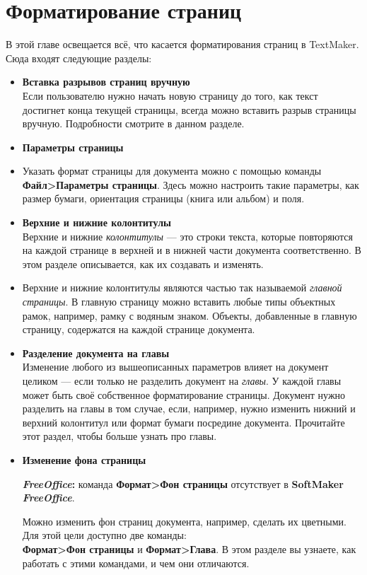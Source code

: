 ﻿\documentclass[a4paper,10pt]{article}
\begin{document}
\section{Форматирование страниц} \label{sec:форматировсстр}
В этой главе освещается всё, что касается форматирования страниц в TextMaker. Сюда входят следующие разделы:
\begin{itemize}
 \item \textbf{Вставка разрывов страниц вручную}\\
 Если пользователю нужно начать новую страницу до того, как текст достигнет конца текущей страницы, всегда можно вставить разрыв страницы вручную. Подробности смотрите в данном разделе.
\item \textbf{Параметры страницы}\\
\item Указать формат страницы для документа можно с помощью команды \textbf{Файл>Параметры страницы}. Здесь можно настроить такие параметры, как размер бумаги, ориентация страницы (книга или альбом) и поля.
\item \textbf{Верхние и нижние колонтитулы}\\
Верхние и нижние \textit{колонтитулы} — это строки текста, которые повторяются на каждой странице в верхней и в нижней части документа соответственно. В этом разделе описывается, как их создавать и изменять.
\item Верхние и нижние колонтитулы являются частью так называемой \textit{главной страницы}. В главную страницу можно вставить любые типы объектных рамок, например, рамку с водяным знаком. Объекты, добавленные в главную страницу, содержатся на каждой странице документа.
\item \textbf{Разделение документа на главы}\\
Изменение любого из вышеописанных параметров влияет на документ целиком — если только не разделить документ на \textit{главы}. У каждой главы может быть своё собственное форматирование страницы. Документ нужно разделить на главы в том случае, если, например, нужно изменить нижний и верхний колонтитул или формат бумаги посредине документа. Прочитайте этот раздел, чтобы больше узнать про главы.
\item \textbf{Изменение фона страницы}
\begin{mdframed}[backgroundcolor=pink!50]
\textbf{\textit{FreeOffice}:} команда \textbf{Формат>Фон страницы} отсутствует в \textbf{SoftMaker \textit{FreeOffice}}.
\end{mdframed}
Можно изменить фон страниц документа, например, сделать их цветными. Для этой цели доступно две команды:\\
\textbf{Формат>Фон страницы} и \textbf{Формат>Глава}. В этом разделе вы узнаете, как работать с этими командами, и чем они отличаются.
\end{itemize}
\end{document}
